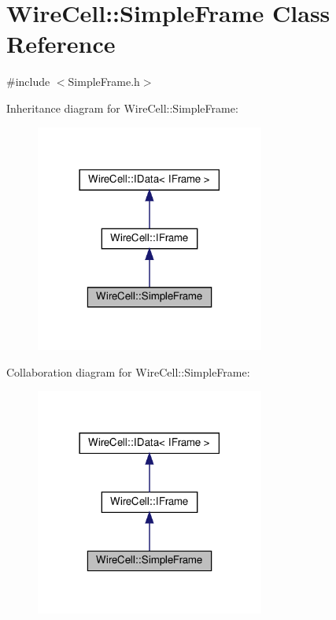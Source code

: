 \hypertarget{class_wire_cell_1_1_simple_frame}{}\section{Wire\+Cell\+:\+:Simple\+Frame Class Reference}
\label{class_wire_cell_1_1_simple_frame}


{\ttfamily \#include $<$Simple\+Frame.\+h$>$}



Inheritance diagram for Wire\+Cell\+:\+:Simple\+Frame\+:
\nopagebreak
\begin{figure}[H]
\begin{center}
\leavevmode
\includegraphics[width=213pt]{class_wire_cell_1_1_simple_frame__inherit__graph}
\end{center}
\end{figure}


Collaboration diagram for Wire\+Cell\+:\+:Simple\+Frame\+:
\nopagebreak
\begin{figure}[H]
\begin{center}
\leavevmode
\includegraphics[width=213pt]{class_wire_cell_1_1_simple_frame__coll__graph}
\end{center}
\end{figure}
